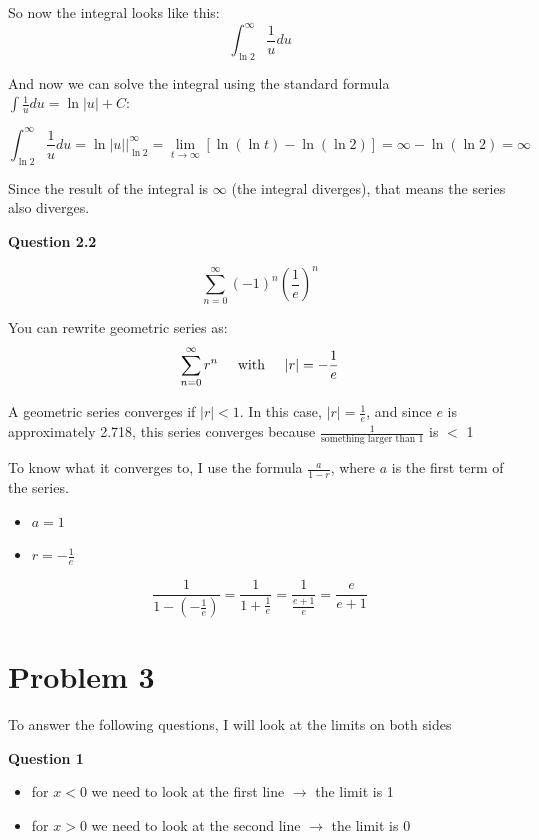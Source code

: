 \documentclass[11pt, a4paper]{article}
\begin{document}
So now the integral looks like this:
\[
\int_{\ln 2}^{\infty} \frac{1}{u} du
\]

And now we can solve the integral using the standard formula $\int \frac{1}{u} du = \ln|u| + C$:

\[
\int_{\ln 2}^{\infty} \frac{1}{u} du = \ln|u| \Big|_{\ln 2}^{\infty} = \lim_{t \to \infty} [\ln(\ln t) - \ln(\ln 2)] = \infty - \ln(\ln 2) = \infty
\]

Since the result of the integral is $\infty$ (the integral diverges), that means the series also diverges.


\textbf{Question 2.2}

\[
\sum_{n=0}^{\infty} {(-1)}^n {(\frac{1}{e})}^n
\]

You can rewrite geometric series as:
\[
\sum_{n=0}^{\infty} r^n \hspace{0.5cm}\text{with}\hspace{0.5cm} |r| = -\frac{1}{e}
\]

A geometric series converges if $|r| < 1$. In this case, $|r| = \frac{1}{e}$, and since $e$ is approximately 2.718, this series converges because $\frac{1}{\text{something larger than 1}}$ is $<$ 1

To know what it converges to, I use the formula $\frac{a}{1 - r}$, where $a$ is the first term of the series.

\begin{itemize}
	\item $a = 1$
	\item $r = -\frac{1}{e}$
\end{itemize}

\[
\frac{1}{1 - (-\frac{1}{e})} = \frac{1}{1 + \frac{1}{e}} = \frac{1}{\frac{e + 1}{e}} = \frac{e}{e + 1}
\]




\pagebreak
\section*{Problem 3}

To answer the following questions, I will look at the limits on both sides

\textbf{Question 1}

\begin{itemize}
	\item for $x < 0$ we need to look at the first line $\rightarrow$ the limit is 1
	\item for $x > 0$ we need to look at the second line $\rightarrow$ the limit is 0
\end{itemize}
\end{document}
